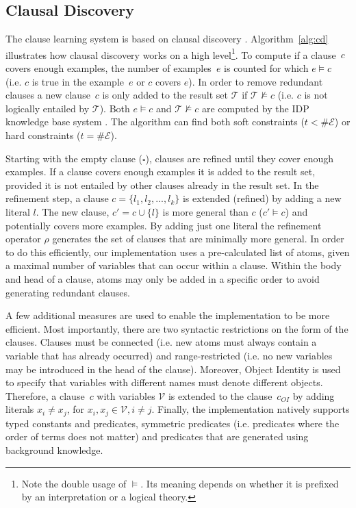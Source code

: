 \documentclass[letterpaper]{article}
\newcommand{\sym}[1]{\ensuremath{\mathcal{#1}}}
\theoremstyle{definition}
\begin{document}
\subsection{Clausal Discovery}
The clause learning system is based on clausal discovery \cite{DeRaedt:ClausalDiscovery}.
Algorithm~\ref{alg:cd} illustrates how clausal discovery works on a high level\footnote{Note the double usage of $\models$. Its meaning depends on whether it is prefixed by an interpretation or a logical theory.}.
To compute if a clause~$c$ covers enough examples, the number of examples~$e$ is counted for which $e \models c$ (i.e. $c$ is true in the example~$e$ or $c$ covers $e$).
In order to remove redundant clauses a new clause~$c$ is only added to the result set $\sym{T}$ if $\sym{T} \not\models c$ (i.e. $c$ is not logically entailed by \sym{T}).
Both $e \models c$ and $\sym{T} \not\models c$ are computed by the IDP knowledge base system \cite{de2013prototype,wittocx2008idp}.
The algorithm can find both soft constraints ($t < \# \sym{E}$) or hard constraints ($t = \# \sym{E}$).

Starting with the empty clause ($\square$), clauses are refined until they cover enough examples.
If a clause covers enough examples it is added to the result set, provided it is not entailed by other clauses already in the result set.
In the refinement step, a clause $c = \{l_1, l_2, ..., l_k\}$ is extended (refined) by adding a new literal $l$.
The new clause, $c' = c \cup \{l\}$ is more general than $c$ ($c' \models c$) and potentially covers more examples.
By adding just one literal the refinement operator $\rho$ generates the set of clauses that are minimally more general.
In order to do this efficiently, our implementation uses a pre-calculated list of atoms, given a maximal number of variables that can occur within a clause.
Within the body and head of a clause, atoms may only be added in a specific order to avoid generating redundant clauses.

A few additional measures are used to enable the implementation to be more efficient.
Most importantly, there are two syntactic restrictions on the form of the clauses.
Clauses must be connected (i.e. new atoms must always contain a variable that has already occurred) and range-restricted (i.e. no new variables may be introduced in the head of the clause).
Moreover, Object Identity is used to specify that variables with different names must denote different objects.
Therefore, a clause~$c$ with variables \sym{V} is extended to the clause~$c_{OI}$ by adding literals $x_i \neq x_j$, for $x_i, x_j \in \sym{V}, i \neq j$.
Finally, the implementation natively supports typed constants and predicates, symmetric predicates (i.e. predicates where the order of terms does not matter) and predicates that are generated using background knowledge.
\end{document}
